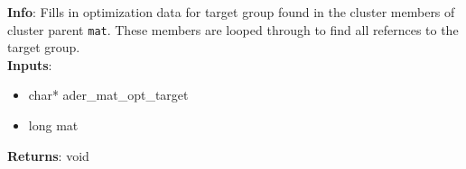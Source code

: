 \textbf{Info}: Fills in optimization data for target group found in the cluster
members of cluster parent \texttt{mat}. These members are looped through to find
all refernces to the target group.\\

\noindent \textbf{Inputs}:
\begin{itemize}
\item{char* ader\_mat\_opt\_target}
\item{long mat}
\end{itemize}

\noindent \textbf{Returns}: void
